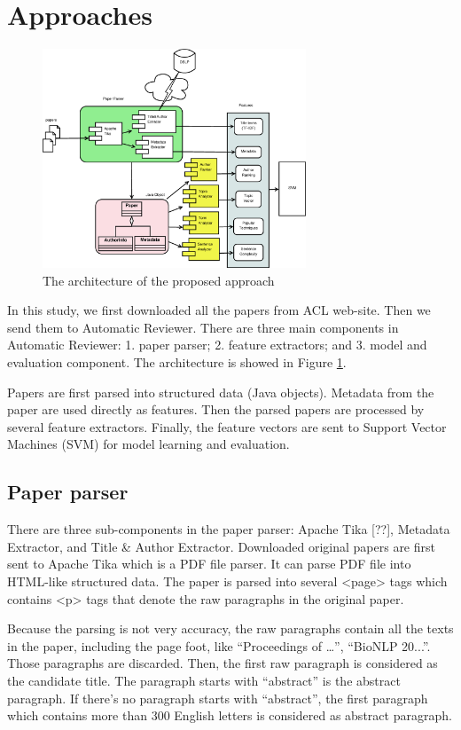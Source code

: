 \documentclass[11pt,letterpaper]{article}
\begin{document}
\section{Approaches}
\begin{figure}[htb]
  \centering
	 	 \includegraphics[width=0.7\textwidth]{materials/architecture.eps}
		\caption{The architecture of the proposed approach}
		\label{fig:architecture}
\end{figure}
In this study, we first downloaded all the papers from ACL web-site. Then we send them to Automatic Reviewer. There are three main components in Automatic Reviewer: 1. paper parser; 2. feature extractors; and 3. model and evaluation component. 
The architecture is showed in Figure \ref{fig:architecture}.

Papers are first parsed into structured data (Java objects). Metadata from the paper are used directly as features. Then the parsed papers are processed by several feature extractors. Finally, the feature vectors are sent to Support Vector Machines (SVM) for model learning and evaluation.




\subsection{Paper parser}

There are three sub-components in the paper parser: Apache Tika [??], Metadata Extractor, and Title \& Author Extractor. 
Downloaded original papers are first sent to Apache Tika which is a PDF file parser. It can parse PDF file into HTML-like structured data. The paper is parsed into several <page> tags which contains <p> tags that denote the raw paragraphs in the original paper. 

Because the parsing is not very accuracy, the raw paragraphs contain all the texts in the paper, including the page foot, like “Proceedings of …”, “BioNLP 20...”. Those paragraphs are discarded. Then, the first raw paragraph is considered as the candidate title. The paragraph starts with “abstract” is the abstract paragraph. If there’s no paragraph starts with “abstract”, the first paragraph which contains more than 300 English letters is considered as abstract paragraph. 
\end{document}
